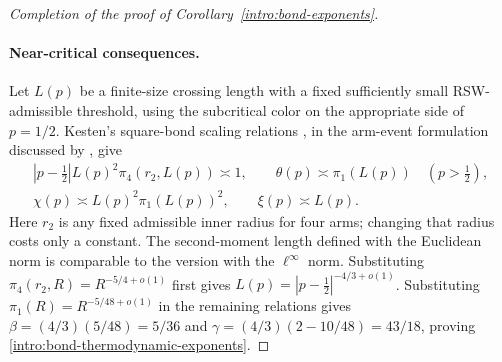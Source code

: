 \begin{proof}[Completion of the proof of Corollary~\ref{intro:bond-exponents}]
\paragraph{Near-critical consequences.}
Let $L(p)$ be a finite-size crossing length with a fixed sufficiently
small RSW-admissible threshold, using the subcritical color on the
appropriate side of $p=1/2$.  Kesten's square-bond scaling relations
\citep{Kesten1987Scaling}, in the arm-event formulation discussed by
\citet[Sections~7--8.1]{Nolin2008NearCritical}, give
\begin{equation}\label{perc:scaling-relations}
\begin{gathered}
 |p-\tfrac12|L(p)^2\pi_4(r_2,L(p))\asymp1,\qquad
 \theta(p)\asymp\pi_1(L(p))\quad(p>\tfrac12),\\
 \chi(p)\asymp L(p)^2\pi_1(L(p))^2,\qquad
 \xi(p)\asymp L(p).
\end{gathered}
\end{equation}
Here $r_2$ is any fixed admissible inner radius for four arms; changing
that radius costs only a constant.  The second-moment length defined
with the Euclidean norm is comparable to the version with the
$\ell^\infty$ norm.  Substituting
$\pi_4(r_2,R)=R^{-5/4+o(1)}$ first gives
$L(p)=|p-\tfrac12|^{-4/3+o(1)}$.  Substituting
$\pi_1(R)=R^{-5/48+o(1)}$ in the remaining relations gives
$\beta=(4/3)(5/48)=5/36$ and
$\gamma=(4/3)(2-10/48)=43/18$, proving
\eqref{intro:bond-thermodynamic-exponents}.
\end{proof}
